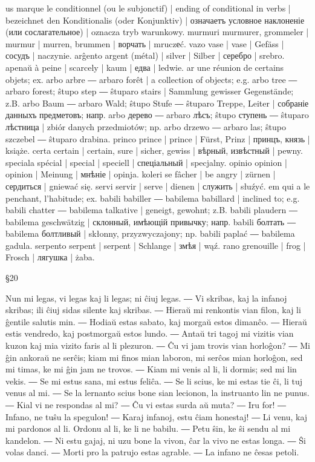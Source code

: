 us marque le conditionnel (ou le subjonctif) | ending of conditional in verbs | bezeichnet den Konditionalis (oder Konjunktiv) | означаетъ условное наклоненіе (или сослагательное) | oznacza tryb warunkowy.
murmuri murmurer, grommeler | murmur | murren, brummen | ворчать | mruczеć.
vazo vase | vase | Gefäss | сосудъ | naczynie.
arĝento argent (métal) | silver | Silber | серебро | srebro.
apenaŭ à peine | scarcely | kaum | едва | ledwie.
ar une réunion de certains objets; ex. arbo arbre ― arbaro forêt | a collection of objects; e.g. arbo tree ― arbaro forest; ŝtupo step ― ŝtuparo stairs | Sammlung gewisser Gegenstände; z.B. arbo Baum ― arbaro Wald; ŝtupo Stufe ― ŝtuparo Treppe, Leiter | собраніе данныхъ предметовъ; напр. arbo дерево ― arbaro лѣсъ; ŝtupo ступень ― ŝtuparo лѣстница | zbiór danych przedmiotów; np. arbo drzewo ― arbaro las; ŝtupo szczebel ― ŝtuparo drabina.
princo prince | prince | Fürst, Prinz | принцъ, князь | książe.
certa certain | certain, sure | sicher, gewiss | вѣрный, извѣстный | pewny.
speciala spécial | special | speciell | спеціальный | specjalny.
opinio opinion | opinion | Meinung | мнѣніе | opinja.
koleri se fâcher | be angry | zürnen | сердиться | gniewać się.
servi servir | serve | dienen | служить | słuźyć.
em qui a le penchant, l’habitude; ex. babili babiller ― babilema babillard | inclined to; e.g. babili chatter ― babilema talkative | geneigt, gewohnt; z.B. babili plaudern ― babilema geschwätzig | склонный, имѣющій привычку; напр. babili болтать ― babilema болтливый | skłonny, przyzwyczajony; np. babili paplać ― babilema gadula.
serpento serpent | serpent | Schlange | змѣя | wąź.
rano grenouille | frog | Frosch | лягушка | żaba.

§20

Nun mi legas, vi legas kaj li legas; ni ĉiuj legas. ― Vi skribas, kaj la infanoj skribas; ili ĉiuj sidas silente kaj skribas. ― Hieraŭ mi renkontis vian filon, kaj li ĝentile salutis min. ― Hodiaŭ estas sabato, kaj morgaŭ estos dimanĉo. ― Hieraŭ estis vendredo, kaj postmorgaŭ estos lundo. ― Antaŭ tri tagoj mi vizitis vian kuzon kaj mia vizito faris al li plezuron. ― Ĉu vi jam trovis vian horloĝon? ― Mi ĝin ankoraŭ ne serĉis; kiam mi finos mian laboron, mi serĉos mian horloĝon, sed mi timas, ke mi ĝin jam ne trovos. ― Kiam mi venis al li, li dormis; sed mi lin vekis. ― Se mi estus sana, mi estus feliĉa. ― Se li scius, ke mi estas tie ĉi, li tuj venus al mi. ― Se la lernanto scius bone sian lecionon, la instruanto lin ne punus. ― Kial vi ne respondas al mi? ― Ĉu vi estas surda aŭ muta? ― Iru for! ― Infano, ne tuŝu la spegulon! ― Karaj infanoj, estu ĉiam honestaj! ― Li venu, kaj mi pardonos al li. Ordonu al li, ke li ne babilu. ― Petu ŝin, ke ŝi sendu al mi kandelon. ― Ni estu gajaj, ni uzu bone la vivon, ĉar la vivo ne estas longa. ― Ŝi volas danci. ― Morti pro la patrujo estas agrable. ― La infano ne ĉesas petoli.

